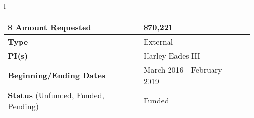 \documentclass[11pt]{article}
\begin{document}
\begin{tabular}{l}
\begin{tabular}{|l|l|l|}
          \hline
          \textbf{\$ Amount Requested} & \$70,221\\
          \hline
          \textbf{Type} & External\\
          \hline
          \textbf{PI(s)} & Harley Eades III\\
          \hline
          \textbf{Beginning/Ending Dates} & March 2016 - February 2019\\
          \hline
          \textbf{Status} (Unfunded, Funded, Pending) & Funded\\
          \hline
        \end{tabular}
    \end{tabular}
\end{document}
